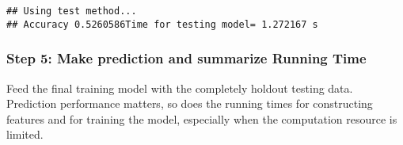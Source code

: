 \documentclass[]{article}
\newenvironment{Shaded}{\begin{snugshade}}{\end{snugshade}}
\newcommand{\KeywordTok}[1]{\textcolor[rgb]{0.13,0.29,0.53}{\textbf{#1}}}
\newcommand{\CharTok}[1]{\textcolor[rgb]{0.31,0.60,0.02}{#1}}
\newcommand{\StringTok}[1]{\textcolor[rgb]{0.31,0.60,0.02}{#1}}
\newcommand{\ControlFlowTok}[1]{\textcolor[rgb]{0.13,0.29,0.53}{\textbf{#1}}}
\newcommand{\OperatorTok}[1]{\textcolor[rgb]{0.81,0.36,0.00}{\textbf{#1}}}
\newcommand{\NormalTok}[1]{#1}
\begin{document}
\begin{verbatim}
## Using test method...
## Accuracy 0.5260586Time for testing model= 1.272167 s
\end{verbatim}

\begin{Shaded}
\end{Shaded}

\subsubsection{Step 5: Make prediction and summarize Running
Time}\label{step-5-make-prediction-and-summarize-running-time}

Feed the final training model with the completely holdout testing data.
Prediction performance matters, so does the running times for
constructing features and for training the model, especially when the
computation resource is limited.
\end{document}
